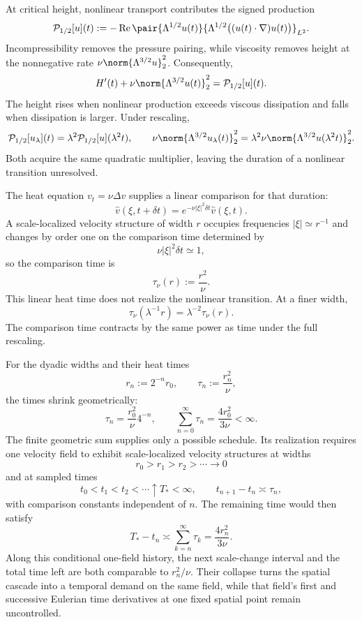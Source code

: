 At critical height, nonlinear transport contributes the signed production
\[
  \mathcal P_{1/2}[u](t)
  :=
  -\operatorname{Re}
  \pair
    {\Lambda^{1/2}u(t)}
    {\Lambda^{1/2}\bigl((u(t)\cdot\nabla)u(t)\bigr)}_{L^2}.
\]
Incompressibility removes the pressure pairing, while viscosity removes height at the nonnegative rate \(\nu\norm{\Lambda^{3/2}u}_2^2\). Consequently,
\[
  H'(t)
  +
  \nu\norm{\Lambda^{3/2}u(t)}_2^2
  =
  \mathcal P_{1/2}[u](t).
\]
The height rises when nonlinear production exceeds viscous dissipation and falls when dissipation is larger. Under rescaling,
\[
  \mathcal P_{1/2}[u_\lambda](t)
  =
  \lambda^2\mathcal P_{1/2}[u](\lambda^2t),
  \qquad
  \nu\norm{\Lambda^{3/2}u_\lambda(t)}_2^2
  =
  \lambda^2\nu\norm{\Lambda^{3/2}u(\lambda^2t)}_2^2.
\]
Both acquire the same quadratic multiplier, leaving the duration of a nonlinear transition unresolved.


The heat equation \(v_t=\nu\Delta v\) supplies a linear comparison for that duration:
\[
  \widehat v(\xi,t+\delta t)
  =
  e^{-\nu|\xi|^2\delta t}\widehat v(\xi,t).
\]
A scale-localized velocity structure of width \(r\) occupies frequencies \(|\xi|\simeq r^{-1}\) and changes by order one on the comparison time determined by
\[
  \nu|\xi|^2\delta t\simeq1,
\]
so the comparison time is
\[
  \tau_\nu(r)
  :=
  \frac{r^2}{\nu}.
\]
This linear heat time does not realize the nonlinear transition. At a finer width,
\[
  \tau_\nu(\lambda^{-1}r)
  =
  \lambda^{-2}\tau_\nu(r).
\]
The comparison time contracts by the same power as time under the full \NavierStokes{} rescaling.


For the dyadic widths and their heat times
\[
  r_n:=2^{-n}r_0,
  \qquad
  \tau_n:=\frac{r_n^2}{\nu},
\]
the times shrink geometrically:
\[
  \tau_n
  =
  \frac{r_0^2}{\nu}4^{-n},
  \qquad
  \sum_{n=0}^{\infty}\tau_n
  =
  \frac{4r_0^2}{3\nu}
  <
  \infty.
\]
The finite geometric sum supplies only a possible schedule. Its realization requires one \NavierStokes{} velocity field to exhibit scale-localized velocity structures at widths
\[
  r_0>r_1>r_2>\cdots\longrightarrow0
\]
and at sampled times
\[
  t_0<t_1<t_2<\cdots\uparrow T_*<\infty,
  \qquad
  t_{n+1}-t_n\asymp\tau_n,
\]
with comparison constants independent of \(n\). The remaining time would then satisfy
\[
  T_*-t_n
  \asymp
  \sum_{k=n}^{\infty}\tau_k
  =
  \frac{4r_n^2}{3\nu}.
\]
Along this conditional one-field history, the next scale-change interval and the total time left are both comparable to \(r_n^2/\nu\). Their collapse turns the spatial cascade into a temporal demand on the same field, while that field's first and successive Eulerian time derivatives at one fixed spatial point remain uncontrolled.
